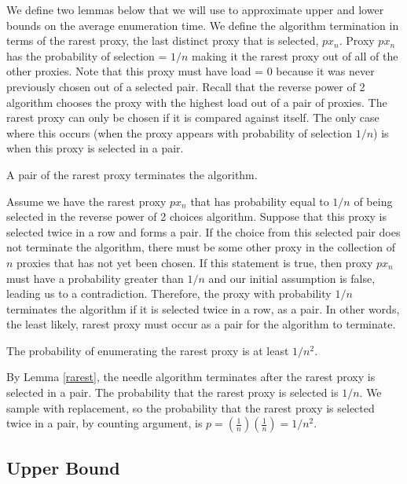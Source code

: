 We define two lemmas below that we will use to approximate upper and lower bounds on the average enumeration time. We define the algorithm termination in terms of the rarest proxy, the last distinct proxy that is selected, $px_n$. Proxy $px_n$ has the probability of selection = $1/n$ making it the rarest proxy out of all of the other proxies. Note that this proxy must have load = 0 because it was never previously chosen out of a selected pair. Recall that the reverse power of 2 algorithm chooses the proxy with the highest load out of a pair of proxies. The rarest proxy can only be chosen if it is compared against itself. The only case where this occurs (when the proxy appears with probability of selection $1/n$) is when this proxy is selected in a pair. 

\begin{lemma}{A pair of the rarest proxy terminates the algorithm.}
\label{rarest}

Assume we have the rarest proxy \textbf{$px_n$} that has probability equal to $1/n$ of being selected in the reverse power of 2 choices algorithm. Suppose that this proxy is selected twice in a row and forms a pair. If the choice from this selected pair does not terminate the algorithm, there must be some other proxy in the collection of $n$ proxies that has not yet been chosen. If this statement is true, then proxy \textbf{$px_n$} must have a probability greater than $1/n$ and our initial assumption is false, leading us to a contradiction. Therefore, the proxy with probability $1/n$ terminates the algorithm if it is selected twice in a row, as a pair. In other words, the least likely, rarest proxy must occur as a pair for the algorithm to terminate. 
\end{lemma}

\begin{lemma}{The probability of enumerating the rarest proxy is at least $1/n^2$.}

By Lemma \ref{rarest}, the needle algorithm terminates after the rarest proxy is selected in a pair. The probability that the rarest proxy is selected is $1/n$. We sample with replacement, so the probability that the rarest proxy is selected twice in a pair, by counting argument, is $p=(\frac{1}{n})(\frac{1}{n}) = 1/n^2$.
\end{lemma}

\subsection{Upper Bound}  

